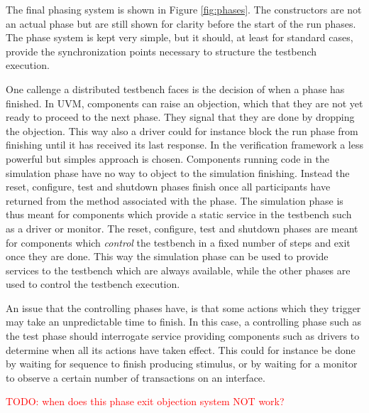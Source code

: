 \documentclass[11pt,a4paper]{report}
\newcommand{\todo}[1]{\textcolor{red}{TODO: #1}}
\begin{document}
The final phasing system is shown in Figure \ref{fig:phases}. The constructors are not an actual phase but are still
shown for clarity before the start of the run phases. The phase system is kept very simple, but it should, at least
for standard cases, provide the synchronization points necessary to structure the testbench execution.

One callenge a distributed testbench faces is the decision of when a phase has finished. In UVM, components can raise an objection, which that they are not yet ready to proceed to the next phase. They signal that they are done by dropping the objection. This way also a driver could for instance block the run phase from finishing until it has received its last response. In the verification framework a less powerful but simples approach is chosen. Components running code in the simulation phase have no way to object to the simulation finishing. Instead the reset, configure, test and shutdown phases finish once all participants have returned from the method associated with the phase. The simulation phase is thus meant for components which provide a static service in the testbench such as a driver or monitor. The reset, configure, test and shutdown phases are meant for components which \textit{control} the testbench in a fixed number of steps and exit once they are done. This way the simulation phase can be used to provide services to the testbench which are always available, while the other phases are used to control the testbench execution. 

An issue that the controlling phases have, is that some actions which they trigger may take an unpredictable time to finish. In this case, a controlling phase such as the test phase should interrogate service providing components such as drivers to determine when all its actions have taken effect. This could for instance be done by waiting for sequence to finish producing stimulus, or by waiting for a monitor to observe a certain number of transactions on an interface. 

\todo{when does this phase exit objection system NOT work?}
\end{document}

